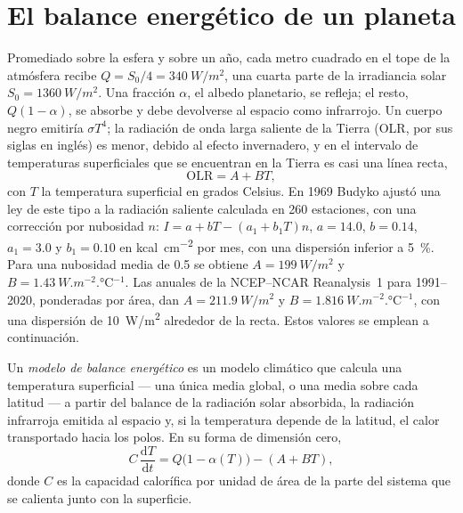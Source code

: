 \section{El balance energético de un planeta}\label{sec:b3:climate-models:zero-d}

Promediado sobre la esfera y sobre un año, cada metro cuadrado en el tope de
la atmósfera recibe $Q = S_0/4 = \qty{340}{W/m^2}$, una cuarta parte de la
irradiancia solar $S_0 = \qty{1360}{W/m^2}$. Una fracción $\alpha$, el
albedo planetario, se refleja; el resto, $Q(1 - \alpha)$, se absorbe y
debe devolverse al espacio como infrarrojo. Un cuerpo negro emitiría $\sigma
T^4$; la radiación de onda larga saliente de la Tierra (OLR, por sus siglas en inglés) es menor, debido al
efecto invernadero, y en el intervalo de temperaturas superficiales que se encuentran en
la Tierra es casi una línea recta,
\[
\text{OLR} = A + BT ,
\]
con $T$ la temperatura superficial en grados Celsius. En 1969 Budyko ajustó
una ley de este tipo a la radiación saliente calculada en 260 estaciones, con una corrección por
nubosidad $n$: $I = a + bT - (a_1 + b_1T)n$, $a = 14.0$, $b = 0.14$, $a_1 =
3.0$ y $b_1 = 0.10$ en \unit{kcal.cm^{-2}} por mes, con una dispersión inferior a
\qty{5}{\percent}. Para una nubosidad media de 0.5 se obtiene $A =
\qty{199}{W/m^2}$ y $B = \qty{1.43}{W.m^{-2}.\celsius^{-1}}$. Las
 anuales de la NCEP--NCAR Reanalysis~1 para 1991--2020, ponderadas por área,
dan $A = \qty{211.9}{W/m^2}$ y $B = \qty{1.816}{W.m^{-2}.\celsius^{-1}}$,
con una dispersión de \qty{10}{W/m^2} alrededor de la recta. Estos valores se
emplean a continuación.

\begin{definition}\label{def:b3:climate-models:ebm}
Un \emph{modelo de balance energético} es un
modelo climático que calcula una temperatura superficial --- una única media global, o una
media sobre cada latitud --- a partir del balance de la radiación solar absorbida, la
radiación infrarroja emitida al espacio y, si la temperatura depende de la latitud, el
calor transportado hacia los polos. En su forma de dimensión cero,
\[
C\,\frac{\mathrm dT}{\mathrm dt} = Q\big(1 - \alpha(T)\big) - (A + BT) ,
\]
donde $C$ es la capacidad calorífica por unidad de área de la parte del sistema que
se calienta junto con la superficie.
\end{definition}

